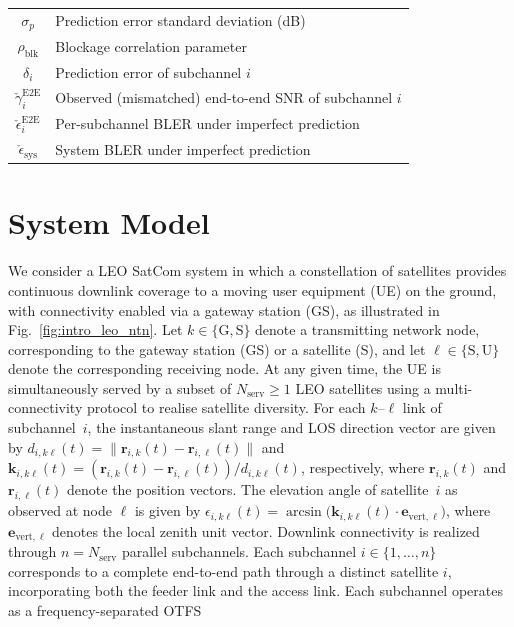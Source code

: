 \documentclass[journal]{IEEEtran}
\newcommand{\vect}[1]{\bm{#1}}
\begin{document}
\begin{table}[t]
\begin{tabular}{@{}cl@{}}
$\sigma_p$ & Prediction error standard deviation (dB) \\
$\rho_{\mathrm{blk}}$ & Blockage correlation parameter \\
$\delta_i$ & Prediction error of subchannel $i$ \\
$\check{\gamma}_i^{\mathrm{E2E}}$ & Observed (mismatched) end-to-end SNR of subchannel $i$\\
$\check{\epsilon}_i^{\mathrm{E2E}}$ & Per-subchannel BLER under imperfect prediction \\
$\check{\epsilon}_{\mathrm{sys}}$ & System BLER under imperfect prediction \\
\bottomrule
\end{tabular}
\end{table}

\section{System Model}
\label{sec:system_model}
We consider a LEO SatCom system in which a constellation of satellites 
provides continuous downlink coverage to a moving user equipment (UE) 
on the ground, with connectivity enabled via a gateway station (GS), 
as illustrated in Fig.~\ref{fig:intro_leo_ntn}. Let 
$k \in \{\mathrm{G},\mathrm{S}\}$ denote a transmitting network node, 
corresponding to the gateway station (GS) or a satellite (S), and let 
$\ell \in \{\mathrm{S},\mathrm{U}\}$ denote the corresponding receiving 
node. At any given time, the UE is simultaneously served by a subset of 
$N_{\text{serv}} \ge 1$ LEO satellites using a multi-connectivity 
protocol to realise satellite diversity. For each $k$--$\ell$ link of subchannel~$i$, the instantaneous slant 
range and LOS direction vector are given by 
$d_{i,k\ell}(t) = \|\vect{r}_{i,k}(t) - \vect{r}_{i,\ell}(t)\|$ and 
$\vect{k}_{i,k\ell}(t) = (\vect{r}_{i,k}(t) - 
\vect{r}_{i,\ell}(t))/d_{i,k\ell}(t)$, respectively, where 
$\vect{r}_{i,k}(t)$ and $\vect{r}_{i,\ell}(t)$ denote the position 
vectors. The elevation angle of satellite~$i$ 
as observed at node $\ell$ is given by 
$\epsilon_{i,k\ell}(t)=\arcsin\!\bigl(\vect{k}_{i,k\ell}(t) \cdot 
\vect{e}_{\mathrm{vert},\ell}\bigr)$, where 
$\vect{e}_{\mathrm{vert},\ell}$ denotes the local zenith unit vector. Downlink connectivity is realized through $n = N_{\text{serv}}$ parallel subchannels. Each subchannel $i \in \{1,\ldots,n\}$ corresponds to a complete end-to-end path through a distinct satellite $i$, incorporating both the feeder link and the access link. Each subchannel operates as a frequency-separated OTFS 
\end{document}

